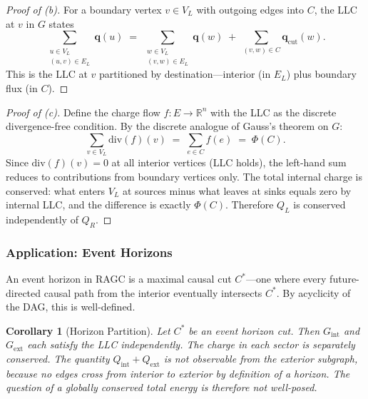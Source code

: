\documentclass[11pt,a4paper]{article}
\theoremstyle{plain}
\newtheorem{corollary}[theorem]{Corollary}
\theoremstyle{definition}
\theoremstyle{remark}
\begin{document}
\begin{proof}[Proof of (b)]
For a boundary vertex $v \in V_{L}$ with outgoing edges into $C$, the LLC at $v$
in $G$ states
\begin{equation}
  \sum_{\substack{u\in V_{L}\\(u,v)\in E_{L}}} \mathbf{q}(u)
  \;=\;
  \sum_{\substack{w\in V_{L}\\(v,w)\in E_{L}}} \mathbf{q}(w)
  \;+\;
  \sum_{(v,w)\in C} \mathbf{q}_{\mathrm{cut}}(w).
\end{equation}
This is the LLC at $v$ partitioned by destination---interior (in $E_{L}$) plus
boundary flux (in $C$).
\end{proof}

\begin{proof}[Proof of (c)]
Define the charge flow $f: E \to \mathbb{R}^{n}$ with the LLC as the discrete
divergence-free condition. By the discrete analogue of Gauss's theorem on $G$:
\begin{equation}
  \sum_{v \in V_{L}} \mathrm{div}(f)(v)
  \;=\;
  \sum_{e \in C} f(e)
  \;=\; \Phi(C).
\end{equation}
Since $\mathrm{div}(f)(v) = 0$ at all interior vertices (LLC holds), the left-hand
sum reduces to contributions from boundary vertices only. The total internal charge
is conserved: what enters $V_{L}$ at sources minus what leaves at sinks equals zero
by internal LLC, and the difference is exactly $\Phi(C)$. Therefore $Q_{L}$ is
conserved independently of $Q_{R}$.
\end{proof}

\subsubsection{Application: Event Horizons}

An event horizon in RAGC is a maximal causal cut $C^{*}$---one where every
future-directed causal path from the interior eventually intersects $C^{*}$. By
acyclicity of the DAG, this is well-defined.

\begin{corollary}[Horizon Partition]
Let $C^{*}$ be an event horizon cut. Then $G_{\mathrm{int}}$ and $G_{\mathrm{ext}}$
each satisfy the LLC independently. The charge in each sector is separately
conserved. The quantity $Q_{\mathrm{int}} + Q_{\mathrm{ext}}$ is not observable
from the exterior subgraph, because no edges cross from interior to exterior by
definition of a horizon. The question of a globally conserved total energy is
therefore not well-posed.
\end{corollary}
\end{document}
